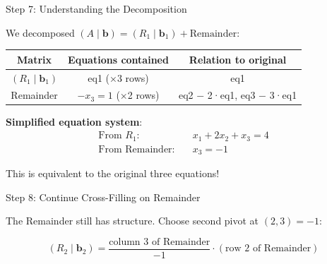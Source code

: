 \documentclass[10pt]{beamer}
\theoremstyle{definition}
\newcommand{\x}[1]{\alert{\textbf{#1}}}
\begin{document}
\begin{frame}{Step 7: Understanding the Decomposition}

We decomposed $(A \mid \mathbf{b}) = (R_1 \mid \mathbf{b}_1) + \text{Remainder}$:

\vspace{1em}

\begin{center}
\begin{tabular}{c|c|c}
\textbf{Matrix} & \textbf{Equations contained} & \textbf{Relation to original} \\
\hline
$(R_1 \mid \mathbf{b}_1)$ & eq1 (×3 rows) & eq1 \\
\hline
Remainder & $-x_3 = 1$ (×2 rows) & eq2 $-$ 2·eq1, eq3 $-$ 3·eq1 \\
\end{tabular}
\end{center}

\vspace{1em}

\x{Simplified equation system}:
\begin{align*}
\text{From } R_1: \quad &x_1 + 2x_2 + x_3 = 4 \\
\text{From Remainder}: \quad &x_3 = -1
\end{align*}

\vspace{0.5em}

This is equivalent to the original three equations!

\end{frame}

\begin{frame}[fragile]{Step 8: Continue Cross-Filling on Remainder}

The Remainder still has structure. Choose second pivot at $(2,3) = -1$:

\begin{center}
\end{center}

\vspace{0.5em}

$$(R_2 \mid \mathbf{b}_2) = \frac{\text{column 3 of Remainder}}{-1} \cdot (\text{row 2 of Remainder})$$

\end{frame}
\end{document}
